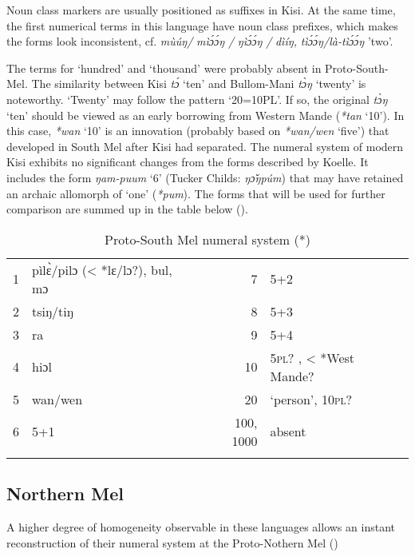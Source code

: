 {Noun class markers are usually positioned as suffixes in Kisi. At the same time, the first numerical terms in this language have noun class prefixes, which makes the forms look inconsistent, cf. \textit{m{\`{u}}{\'{u}}ŋ/} \textit{mì{\'{ɔ}}{\'{ɔ}}ŋ} \textit{/} \textit{ŋì{\'{ɔ}}{\'{ɔ}}ŋ} \textit{/} \textit{dìíŋ,} \textit{tì{\'{ɔ}}{\'{ɔ}}ŋ/là-tì{\'{ɔ}}{\'{ɔ}}ŋ} ’two’.

The terms for ‘hundred’ and ‘thousand’ were probably absent in Proto-South-Mel. The similarity between Kisi \textit{t{\'{ɔ}}} ‘ten’ and Bullom-Mani \textit{t{\`{ɔ}}ŋ} ‘twenty’ is noteworthy. ‘Twenty’ may follow the pattern ‘20=10PL’. If so, the original \textit{t{\`{ɔ}}ŋ} ‘ten’ should be viewed as an early borrowing from Western Mande (\textit{*tan} ‘10’). In this case, \textit{*wan} ‘10’ is an innovation (probably based on \textit{*wan/wen} ‘five’) that developed in South Mel after Kisi had separated.  The numeral system of modern Kisi exhibits no significant changes from the forms described by Koelle. It includes the form \textit{ŋam-puum} ‘6’ (Tucker Childs: \textit{ŋ{\v{ɔ}}ŋp{\'{u}}m}) that may have retained an archaic allomorph of ‘one’ (\textit{*pum}). The forms that will be used for further comparison are summed up in the table below ().

\begin{table}
\caption{\label{tab:3:217}Proto-South Mel numeral system (*)}


\begin{tabularx}{\textwidth}{lQrQ}
\lsptoprule

1 & pìl{\`{ɛ}}/pilɔ (< *lɛ/lɔ?), bul, mɔ & 7 & 5+2\\
2 & tsiŋ/tiŋ & 8 & 5+3\\
3 & ra & 9 & 5+4\\
4 & hiɔl & 10 & 5\textsc{pl}? , < *West Mande? \\
5 & wan/wen & 20 & ‘person’, 10\textsc{pl}? \\
6 & 5+1 &  {100,} 1000 & absent\\
\lspbottomrule
\end{tabularx}
\end{table}
  
 
\subsection{Northern Mel}%
A higher degree of homogeneity observable in these languages allows an instant reconstruction of their numeral system at the Proto-Nothern Mel ()

}
